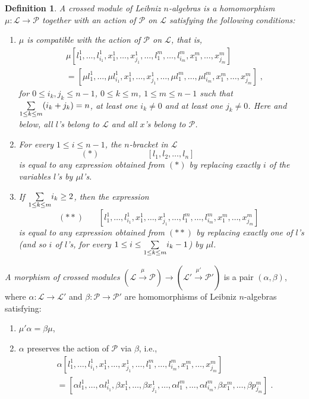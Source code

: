 \documentclass[12pt, reqno]{amsart}
\newtheorem{definition}{Definition}[section]
\begin{document}
\begin{definition}\cite{CKL1}\label{Def crossed mod}
A crossed module of Leibniz $n$-algebras is a homomorphism
$\mu:\mathcal{L}\to \mathcal{P}$ together with an action of
$\mathcal{P}$ on $\mathcal{L}$ satisfying the following
conditions:
\begin{enumerate}
\item[(CM1)] $\mu$ is compatible with the action of
$\mathcal{P}$ on $\mathcal{L}$, that is,
\begin{align*}
&\mu[l_1^1,\dots,l_{i_1}^1,x_1^1,\dots,x_{j_1}^1,\dots,l_1^m,\dots,l_{i_m}^m,x_1^m,\dots,x_{j_m}^m]\\&=
[\mu l_1^1,\dots,\mu l_{i_1}^1,x_1^1,\dots,x_{j_1}^1,\dots,\mu
l_1^m,\dots,\mu l_{i_m}^m,x_1^m,\dots,x_{j_m}^m]\;,
\end{align*}
for $0\leq i_k,j_k \leq n-1$, $0\leq k\leq m$, $1\leq m\leq n-1$
such that $\underset{\scriptsize{1\leq k\leq m}}\sum (i_k+j_k)=n$,
at least one $i_k\neq 0$ and at least one $j_k\neq 0$. Here and below, all $l$'s belong to $\mathcal{L}$ and all $x$'s belong to $\mathcal{P}$.
\item[(CM2)] For every $1\leq i \leq n-1$, the $n$-bracket
in $\mathcal{L}$
$$
(*)\ \ \ \ \  \ \ \ \ \ \ \ \  \ \ \  \ \ \ \ \  \ \ \ \ \
   [l_1,l_2,\dots,l_n ] \ \ \ \ \ \ \ \ \ \ \ \ \ \ \ \ \
\ \ \ \  \ \ \ \ \
$$
 is equal to any expression obtained from
$(*)$ by replacing exactly $i$ of the variables $l$'s by $\mu
l$'s.
\item[(CM3)] If $\underset{\scriptsize{1\leq k\leq
m}}\sum i_k\geq 2$, then the expression
$$
(**) \ \ \ \ \  \ \ \
[l_1^1,\dots,l_{i_1}^1,x_1^1,\dots,x_{j_1}^1,\dots,l_1^m,\dots,l_{i_m}^m,x_1^m,\dots,x_{j_m}^m]\
\ \
$$
is equal to any expression obtained from $(**)$ by replacing
exactly one of $l$'s (and so $i$ of $l$'s, for every $1\leq i\leq
\underset{\scriptsize{1\leq k\leq m}}\sum i_k -1$) by $\mu l$.
\end{enumerate}
\end{definition}

{\em A morphism of crossed modules}
$(\mathcal{L}\overset{\mu}\longrightarrow\mathcal{P})\to
(\mathcal{L'}\overset{\mu'}\longrightarrow\mathcal{P'})$ is a pair
$(\alpha,\beta)$, where $\alpha:\mathcal{L}\to \mathcal{L'}$ and
$\beta:\mathcal{P}\to \mathcal{P'}$ are homomorphisms of Leibniz
$n$-algebras satisfying:
\begin{enumerate}
\item[i)] $\mu'\alpha=\beta\mu$, \item[ii)] $\alpha$ preserves the action
of $\mathcal{P}$ via $\beta$, i.e.,
\begin{align*}
&\alpha[l_1^1,\dots,l_{i_1}^1,x_1^1,\dots,x_{j_1}^1,\dots,l_1^m,\dots,l_{i_m}^m,x_1^m,\dots,x_{j_m}^m]\\&=
[\alpha l_1^1,\dots,\alpha l_{i_1}^1,\beta x_1^1,\dots,\beta
x_{j_1}^1,\dots,\alpha l_1^m,\dots,\alpha l_{i_m}^m,\beta x_1^m,\dots,\beta
p_{j_m}^m]\;.
\end{align*}
\end{enumerate}
\end{document}
